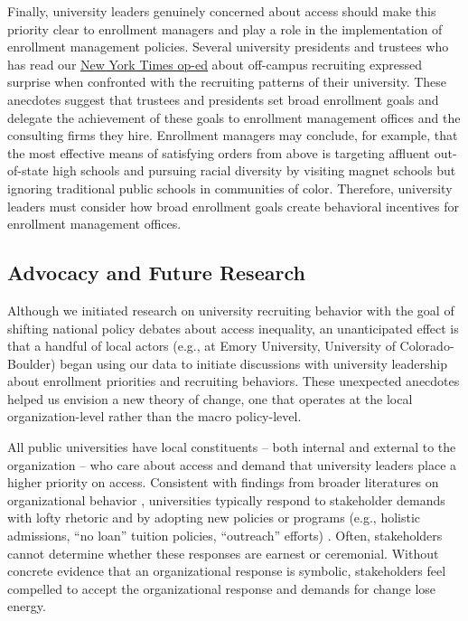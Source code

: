 \documentclass[twoside]{article}
\begin{document}
Finally, university leaders genuinely concerned about access should make this priority clear to enrollment managers and play a role in the implementation of enrollment management policies.  Several university presidents and trustees who has read our \href{https://www.nytimes.com/interactive/2018/04/13/opinion/college-recruitment-rich-white.html}{New York Times op-ed} about off-campus recruiting expressed surprise when confronted with the recruiting patterns of their university.  These anecdotes suggest that trustees and presidents set broad enrollment goals and delegate the achievement of these goals to enrollment management offices and the consulting firms they hire. Enrollment managers may conclude, for example, that the most effective means of satisfying orders from above is targeting affluent out-of-state high schools and pursuing racial diversity by visiting magnet schools but ignoring traditional public schools in communities of color.  Therefore, university leaders must consider how broad enrollment goals create behavioral incentives for enrollment management offices.


\subsection*{Advocacy and Future Research}

Although we initiated research on university recruiting behavior with the goal of shifting national policy debates about access inequality, an unanticipated effect is that a handful of local actors (e.g., at Emory University, University of Colorado-Boulder) began using our data to initiate discussions with university leadership about enrollment priorities and recruiting behaviors.  These unexpected anecdotes helped us envision a new theory of change, one that operates at the local organization-level rather than the macro policy-level.

All public universities have local constituents -- both internal and external to the organization -- who care about access and demand that university leaders place a higher priority on access.  Consistent with findings from broader literatures on organizational behavior \citep{RN2436}, universities typically respond to stakeholder demands with lofty rhetoric and by adopting new policies or programs (e.g., holistic admissions, ``no loan'' tuition policies, ``outreach'' efforts) \citep{RN4017}.  Often, stakeholders cannot determine whether these responses are earnest or ceremonial. Without concrete evidence that an organizational response is symbolic, stakeholders feel compelled to accept the organizational response and demands for change lose energy.
\end{document}
